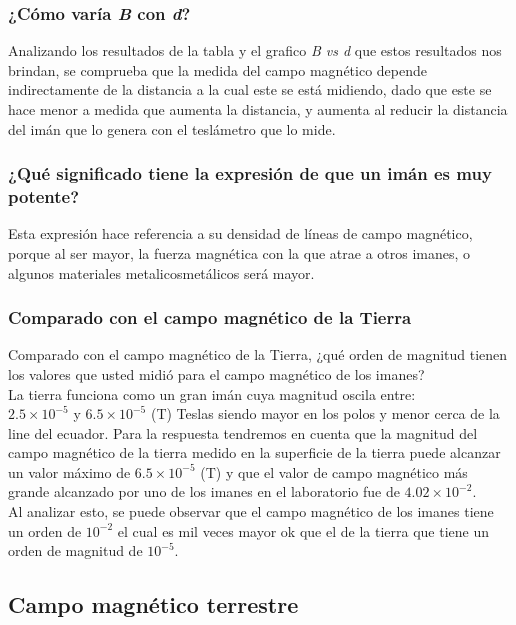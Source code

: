 \subsubsection{¿Cómo varía \textit{B} con \textit{d}?}
Analizando los resultados de la tabla y el grafico \textit{B vs d} que estos
resultados nos brindan, se comprueba que la medida del campo magnético depende
indirectamente de la distancia a la cual este se está midiendo, dado que este se
hace menor a medida que aumenta la distancia, y aumenta al reducir la distancia
del imán que lo genera con el teslámetro que lo mide.


\subsubsection{¿Qué significado tiene la expresión de que un imán es muy potente?}
Esta expresión hace referencia a su densidad de líneas de campo magnético,
porque al ser mayor, la fuerza magnética con la que atrae a otros imanes, o
algunos materiales metalicosmetálicos será mayor.


\subsubsection{Comparado con el campo magnético de la Tierra}
Comparado con el campo magnético de la Tierra, ¿qué orden de magnitud tienen los
valores que usted midió para el campo magnético de los imanes?\\

La tierra funciona como un gran imán cuya magnitud oscila entre:\\

\(2.5\times10^{-5}\) y \(6.5\times10^{-5}\) (T) Teslas siendo mayor en los polos
y menor cerca de la line del ecuador. Para la respuesta tendremos en cuenta que
la magnitud del campo magnético de la tierra medido en la superficie de la
tierra puede alcanzar un valor máximo de \(6.5\times10^{-5}\) (T) y que el
valor de campo magnético más grande alcanzado por uno de los imanes en el
laboratorio fue de \(4.02\times10^{-2}\).\\

Al analizar esto, se puede observar que el campo magnético de los imanes tiene
un orden de \(10^{-2}\) el cual es mil veces mayor ok que el de la tierra
que tiene un orden de magnitud de \(10^{-5}\).


\subsection{Campo magnético terrestre}

